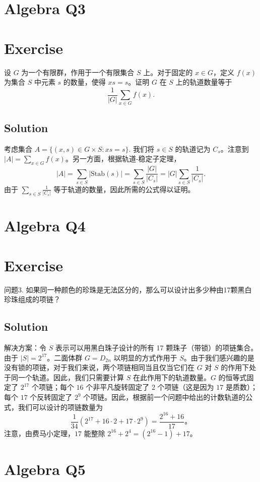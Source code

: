 \documentclass[12pt]{book}
\begin{document}
\section{Algebra Q3}
\section*{Exercise}
设 $G$ 为一个有限群，作用于一个有限集合 $S$ 上。对于固定的 $x \in G$，定义 $f(x)$ 为集合 $S$ 中元素 $s$ 的数量，使得 $xs = s$。证明 $G$ 在 $S$ 上的轨道数量等于
\[
\frac{1}{|G|} \sum_{x \in G} f(x).
\]



\subsection*{Solution}
考虑集合 $A = \{(x, s) \in G \times S : xs = s\}$. 我们将 $s \in S$ 的轨道记为 $C_s$。注意到 $|A| = \sum_{x \in G} f(x)$。另一方面，根据轨道-稳定子定理，
\[
|A| = \sum_{s \in S} |\text{Stab}(s)| = \sum_{s \in S} \frac{|G|}{|C_s|} = |G| \sum_{s \in S} \frac{1}{|C_s|}.
\]
由于 $\sum_{s \in S} \frac{1}{|C_s|}$ 等于轨道的数量，因此所需的公式得以证明。
\newpage
\section{Algebra Q4}
\section*{Exercise}
问题3. 如果同一种颜色的珍珠是无法区分的，那么可以设计出多少种由17颗黑白珍珠组成的项链？



\subsection*{Solution}
解决方案：令 $S$ 表示可以用黑白珠子设计的所有 17 颗珠子（带锁）的项链集合。由于 $|S|=2^{17}$。二面体群 $G=D_{2n}$ 以明显的方式作用于 $S$。由于我们感兴趣的是没有锁的项链，对于我们来说，两个项链相同当且仅当它们在 $G$ 对 $S$ 的作用下处于同一个轨道。因此，我们只需要计算 $S$ 在此作用下的轨道数量。$G$ 的恒等式固定了 $2^{17}$ 个项链；每个 $16$ 个非平凡旋转固定了 $2$ 个项链（这是因为 $17$ 是质数）；每个 $17$ 个反转固定了 $2^{9}$ 个项链。因此，根据前一个问题中给出的计数轨道的公式，我们可以设计的项链数量为
\[
\frac{1}{34}(2^{17} + 16 \cdot 2 + 17 \cdot 2^{9}) = \frac{2^{16} + 16}{17}。
\]
注意，由费马小定理，$17$ 能整除 $2^{16} + 2^{4} = (2^{16} - 1) + 17$。
\newpage
\section{Algebra Q5}
\end{document}
